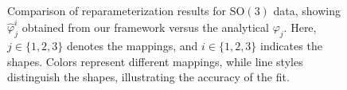 \begin{figure}[!ht]
    \caption[Reparameterization of Curves in \(\mathrm{SO}(3)\)]{Comparison of reparameterization results for \(\mathrm{SO}(3)\) data, showing \(\hat{\varphi}_j^{i}\) obtained from our framework versus the analytical \(\varphi_j\). Here, \(j \in \{1, 2, 3\}\) denotes the mappings, and \(i \in \{1, 2, 3\}\) indicates the shapes. Colors represent different mappings, while line styles distinguish the shapes, illustrating the accuracy of the fit.}
    \label{fig:reparameterization-SO3-SLERP}
\end{figure}

